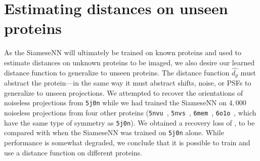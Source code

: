 \section{Estimating distances on unseen proteins}\label{apx:unseen-proteins}

As the SiameseNN will ultimately be trained on known proteins and used to estimate distances on unknown proteins to be imaged,
we also desire our learned distance function to generalize to unseen proteins.
The distance function $\widehat{d_p}$ must abstract the protein---in the same way it must abstract shifts, noise, or PSFs to generalize to unseen projections.
We attempted to recover the orientations of noiseless projections from \texttt{5j0n} while we had trained the SiameseNN on $4,000$ noiseless projections from four other proteins (\texttt{5nvu}~\cite{ZHANG20171303}, \texttt{5nvs}~\cite{ZHANG20171303}, \texttt{6mem}~\cite{iwai2018unique}, \texttt{6o1o}~\cite{liu2019target}, which have the same type of symmetry as \texttt{5j0n}).
We obtained a recovery loss of ,
to be compared with  when the SiameseNN was trained on \texttt{5j0n} alone.
While performance is somewhat degraded, we conclude that it is possible to train and use a distance function on different proteins.



